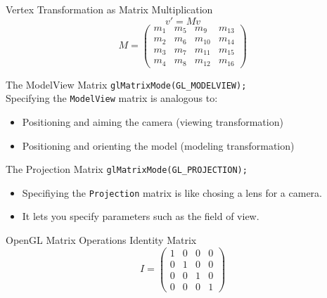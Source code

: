 \documentclass[aspectratio=1610,xcolor=dvipsnames,t]{beamer}
\newcommand{\showcode}[1]{\begin{mdframed}[style=code] %
                          \end{mdframed}%
}
\begin{document}
\begin{frame}{Vertex Transformation as Matrix Multiplication} 
    \begin{equation*}
        v' = M v
    \end{equation*} 
    \vspace{1cm} 
    \begin{equation*} 
        M = \left(
                \begin{array}{cccc}
                    m_{1}   & m_{5}     & m_{9}     & m_{13} \\
                    m_{2}   & m_{6}     & m_{10}    & m_{14} \\
                    m_{3}   & m_{7}     & m_{11}    & m_{15} \\
                    m_{4}   & m_{8}     & m_{12}    & m_{16} 
                \end{array} 
            \right)
    \end{equation*} 
\end{frame} 

\begin{frame}{The ModelView Matrix}
    \texttt{glMatrixMode(GL\_MODELVIEW);} \\[1cm]
    Specifying the \texttt{ModelView} matrix is analogous to:
    \begin{itemize} 
        \item Positioning and aiming the camera (viewing transformation)
        \item Positioning and orienting the model (modeling transformation)
    \end{itemize} 
\end{frame} 

\begin{frame}{The Projection Matrix}
\texttt{glMatrixMode(GL\_PROJECTION);} \\[1cm]
    \begin{itemize} 
        \item Specifiying the \texttt{Projection} matrix is like chosing a lens for a camera.
        \item It lets you specify parameters such as the field of view.
    \end{itemize} 
\end{frame} 

\begin{frame}{OpenGL Matrix Operations} 
    Identity Matrix
    \begin{equation*}
    I = \left(
                \begin{array}{cccc}
                    1   & 0     & 0     & 0     \\
                    0   & 1     & 0     & 0     \\
                    0   & 0     & 1     & 0     \\
                    0   & 0     & 0     & 1
                \end{array} 
            \right)
    \end{equation*} 
    \showcode{matrixops.c} 
\end{frame} 
\end{document}
